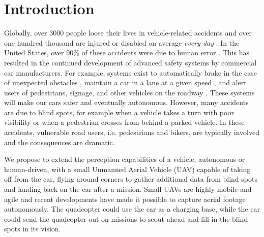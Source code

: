 
\section{Introduction}


%
%

Globally, over 3000 people loose their lives in vehicle-related accidents and over one hundred thousand are injured or disabled on average \emph{every day} \cite{ASIR2016}.
In the United States, over 90\% of these accidents were due to human error \cite{NHTSA_crash_stats}.
This has resulted in the continued development of advanced safety systems by commercial car manufacturers.
For example, systems exist to automatically brake in the case of unexpected obstacles \cite{Toyota_patent}, maintain a car in a lane at a given speed \cite{bradley2016tesla}, and alert users of pedestrians, signage, and other vehicles on the roadway \cite{Dagan_IVS_2004}. These systems will make our cars safer and eventually autonomous.
However, many accidents are due to blind spots, for example when a vehicle takes a turn with poor visibility or when a pedestrian crosses from behind a parked vehicle. In these accidents, vulnerable road users, i.e. pedestrians and bikers, are typically involved and the consequences are dramatic.

We propose to extend the perception capabilities of a vehicle, autonomous or human-driven, with a small Unmanned Aerial Vehicle (UAV) capable of taking off from the car, flying around corners to gather additional data from blind spots and landing back on the car after a mission. Small UAVs are highly mobile and agile and recent developments have made it possible to capture aerial footage autonomously\cite{naegeli17letters}.
The quadcopter could use the car as a charging base,
while the car could send the quadcopter out on missions to scout ahead and
fill in the blind spots in its vision.

